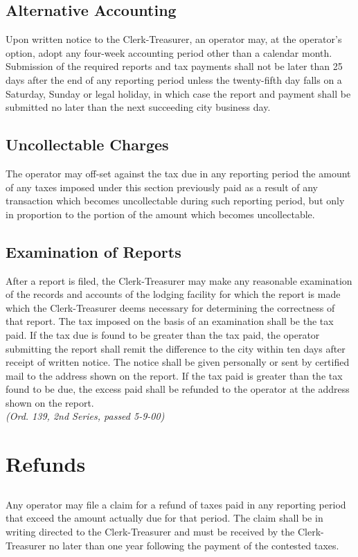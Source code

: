 \subsection{Alternative Accounting}
Upon written notice to the Clerk-Treasurer, an operator may, at the operator’s option, adopt any four-week accounting period other than a calendar month.  Submission of the required reports and tax payments shall not be later than 25 days after the end of any reporting period unless the twenty-fifth day falls on a Saturday, Sunday or legal holiday, in which case the report and payment shall be submitted no later than the next succeeding city business day.
\subsection{Uncollectable Charges}
The operator may off-set against the tax due in any reporting period the amount of any taxes imposed under this section previously paid as a result of any transaction which becomes uncollectable during such reporting period, but only in proportion to the portion of the amount which becomes uncollectable.
\subsection{Examination of Reports}
After a report is filed, the Clerk-Treasurer may make any reasonable examination of the records and accounts of the lodging facility for which the report is made which the Clerk-Treasurer deems necessary for determining the correctness of that report. The tax imposed on the basis of an examination shall be the tax paid. If the tax due is found to be greater than the tax paid, the operator submitting the report shall remit the difference to the city within ten days after receipt of written notice. The notice shall be given personally or sent by certified mail to the address shown on the report. If the tax paid is greater than the tax found to be due, the excess paid shall be refunded to the operator at the address shown on the report.\\
\emph{(Ord. 139, 2nd Series, passed 5-9-00)}

\section{Refunds}
\subsection{}
Any operator may file a claim for a refund of taxes paid in any reporting period that exceed the amount actually due for that period. The claim shall be in writing directed to the Clerk-Treasurer and must be received by the Clerk-Treasurer no later than one year following the payment of the contested taxes.
